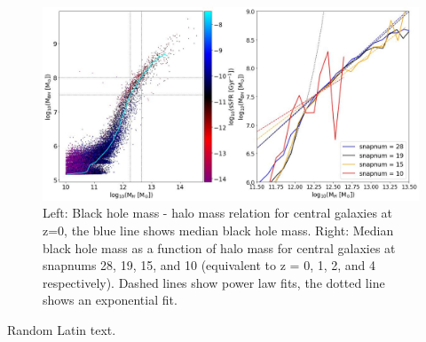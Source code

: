 \documentclass[12pt, twocolumn]{revtex4}    %
\begin{document}
\begin{figure}[H]
\centering
\includegraphics[width=17cm]{Plot_3.jpeg}
\caption{Left: Black hole mass - halo mass relation for central galaxies at z=0, the blue line shows median black hole mass. Right: Median black hole mass as a function of halo mass for central galaxies at snapnums 28, 19, 15, and 10 (equivalent to z = 0, 1, 2, and 4 respectively). Dashed lines show power law fits, the dotted line shows an exponential fit.}
\label{fig:3}
\end{figure}
\twocolumngrid


Random Latin text.

\onecolumngrid
\end{document}
